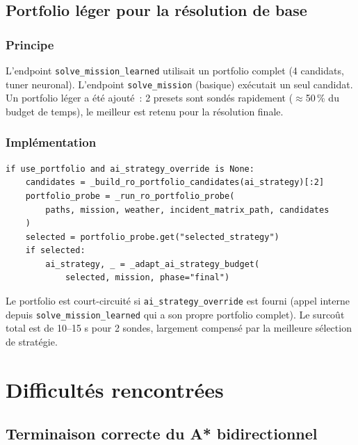 \documentclass[a4paper, 12pt, twoside]{article}
\begin{document}
\subsection{Portfolio l\'{e}ger pour la r\'{e}solution de base}

\subsubsection{Principe}

L'endpoint \texttt{solve\_mission\_learned} utilisait un portfolio complet (4 candidats, tuner neuronal). L'endpoint \texttt{solve\_mission} (basique) ex\'{e}cutait un seul candidat. Un portfolio l\'{e}ger a \'{e}t\'{e} ajout\'{e}~: 2 presets sont sond\'{e}s rapidement ($\approx$50\,\% du budget de temps), le meilleur est retenu pour la r\'{e}solution finale.

\subsubsection{Impl\'{e}mentation}

\begin{lstlisting}[caption={Portfolio l\'{e}ger dans solve\_mission}, label=lst:portfolio]
if use_portfolio and ai_strategy_override is None:
    candidates = _build_ro_portfolio_candidates(ai_strategy)[:2]
    portfolio_probe = _run_ro_portfolio_probe(
        paths, mission, weather, incident_matrix_path, candidates
    )
    selected = portfolio_probe.get("selected_strategy")
    if selected:
        ai_strategy, _ = _adapt_ai_strategy_budget(
            selected, mission, phase="final")
\end{lstlisting}

Le portfolio est court-circuit\'{e} si \texttt{ai\_strategy\_override} est fourni (appel interne depuis \texttt{solve\_mission\_learned} qui a son propre portfolio complet). Le surco\^{u}t total est de 10--15 s pour 2 sondes, largement compens\'{e} par la meilleure s\'{e}lection de strat\'{e}gie.

\section{Difficult\'{e}s rencontr\'{e}es}

\subsection{Terminaison correcte du A* bidirectionnel}
\end{document}
